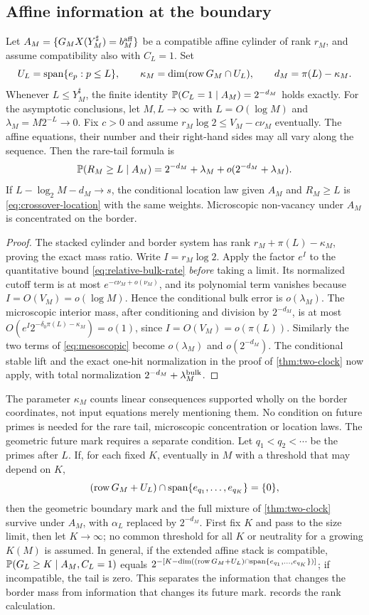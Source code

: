 \subsection{Affine information at the boundary}
\begin{theorem}\label{thm:affine-crossover}
Let $A_M=\{G_M X(Y_M^\sharp)=b_M^{\rm aff}\}$ be a compatible affine
cylinder of rank $r_M$, and assume compatibility also with $C_L=1$.
Set
\[
 U_L=\operatorname{span}\{e_p:p\le L\},\qquad
 \kappa_M=\dim(\operatorname{row}G_M\cap U_L),\qquad
 d_M=\pi(L)-\kappa_M.
\]
Whenever $L\le Y_M^\sharp$, the finite identity
$\mathbb P(C_L=1\mid A_M)=2^{-d_M}$ holds exactly.
For the asymptotic conclusions, let $M,L\to\infty$ with
$L=O(\log M)$ and $\lambda_M=M2^{-L}\to0$.
Fix $c>0$ and assume $r_M\log2\le V_M-c\nu_M$ eventually.
The affine equations, their number and their right-hand sides may all
vary along the sequence. Then the rare-tail formula is
\[
 \mathbb P(R_M\ge L\mid A_M)=2^{-d_M}+\lambda_M+o(2^{-d_M}+\lambda_M).
\]
If $L-\log_2M-d_M\to s$, the conditional location law given
$A_M$ and $R_M\ge L$ is \eqref{eq:crossover-location} with the same
weights. Microscopic non-vacancy under $A_M$ is concentrated on the border.
\end{theorem}
\begin{proof}
The stacked cylinder and border system has rank
$r_M+\pi(L)-\kappa_M$, proving the exact mass ratio.
Write $I=r_M\log2$. Apply the factor $e^I$ to the quantitative bound
\eqref{eq:relative-bulk-rate} \emph{before} taking a limit. Its normalized
cutoff term is at most $e^{-c\nu_M+o(\nu_M)}$, and its polynomial term
vanishes because $I=O(V_M)=o(\log M)$. Hence the conditional bulk error
is $o(\lambda_M)$.
The microscopic interior mass, after conditioning and division by
$2^{-d_M}$, is at most
$O(e^I2^{-\delta_0\pi(L)-\kappa_M})=o(1)$, since
$I=O(V_M)=o(\pi(L))$. Similarly the two terms of
\eqref{eq:mesoscopic} become $o(\lambda_M)$ and $o(2^{-d_M})$.
The conditional stable lift and the exact one-hit normalization in the
proof of \cref{thm:two-clock} now apply, with total normalization
$2^{-d_M}+\lambda_M^{\rm bulk}$.
\end{proof}
The parameter $\kappa_M$ counts linear consequences supported wholly on
the border coordinates, not input equations merely mentioning them.
No condition on future primes is needed for the rare tail, microscopic
concentration or location laws. The geometric future mark requires a
separate condition. Let $q_1<q_2<\cdots$ be the primes after $L$.
If, for each fixed $K$, eventually in $M$ with a threshold that may depend
on $K$,
\[
 (\operatorname{row}G_M+U_L)\cap\operatorname{span}\{e_{q_1},\ldots,e_{q_K}\}=\{0\},
\]
then the geometric boundary mark and the full mixture of
\cref{thm:two-clock} survive under $A_M$, with $\alpha_L$ replaced by
$2^{-d_M}$. First fix $K$ and pass to the size limit, then let $K\to\infty$;
no common threshold for all $K$ or neutrality for a growing $K(M)$ is
assumed. In general, if the extended affine stack is compatible,
$\mathbb P(G_L\ge K\mid A_M,C_L=1)$ equals
$2^{-[K-\dim((\operatorname{row}G_M+U_L)\cap\operatorname{span}\{e_{q_1},\ldots,e_{q_K}\})]}$;
if incompatible, the tail is zero. This separates the information that
changes the border mass from information that changes its future mark.
 records the rank calculation.
